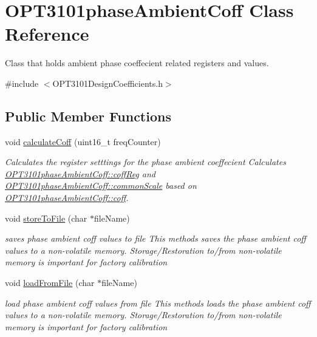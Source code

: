 \hypertarget{class_o_p_t3101phase_ambient_coff}{}\section{O\+P\+T3101phase\+Ambient\+Coff Class Reference}
\label{class_o_p_t3101phase_ambient_coff}


Class that holds ambient phase coeffecient related registers and values.  




{\ttfamily \#include $<$O\+P\+T3101\+Design\+Coefficients.\+h$>$}

\subsection*{Public Member Functions}
\begin{DoxyCompactItemize}
\item 
void \mbox{\hyperlink{class_o_p_t3101phase_ambient_coff_a926e3a0dcadac3172c34982bbf8e1bbe}{calculate\+Coff}} (uint16\+\_\+t freq\+Counter)
\begin{DoxyCompactList}\small\item\em Calculates the register setttings for the phase ambient coeffecient Calculates \mbox{\hyperlink{class_o_p_t3101phase_ambient_coff_a7b9be6815f936c44329b53f5f57b3d6c}{O\+P\+T3101phase\+Ambient\+Coff\+::coff\+Reg}} and \mbox{\hyperlink{class_o_p_t3101phase_ambient_coff_ac2976af69df6837bd7bc1881b87f7188}{O\+P\+T3101phase\+Ambient\+Coff\+::common\+Scale}} based on \mbox{\hyperlink{class_o_p_t3101phase_ambient_coff_a0174483b15a3819cf8b30fcad00f7dda}{O\+P\+T3101phase\+Ambient\+Coff\+::coff}}. \end{DoxyCompactList}\item 
void \mbox{\hyperlink{class_o_p_t3101phase_ambient_coff_aa7ff470b91c005c7e6c589f70ad5f5b8}{store\+To\+File}} (char $\ast$file\+Name)
\begin{DoxyCompactList}\small\item\em saves phase ambient coff values to file This methods saves the phase ambient coff values to a non-\/volatile memory. Storage/\+Restoration to/from non-\/volatile memory is important for factory calibration \end{DoxyCompactList}\item 
void \mbox{\hyperlink{class_o_p_t3101phase_ambient_coff_a9a0cc8986689fd6bb3c2fdc13f3182d6}{load\+From\+File}} (char $\ast$file\+Name)
\begin{DoxyCompactList}\small\item\em load phase ambient coff values from file This methods loads the phase ambient coff values to a non-\/volatile memory. Storage/\+Restoration to/from non-\/volatile memory is important for factory calibration \end{DoxyCompactList}\end{DoxyCompactItemize}
